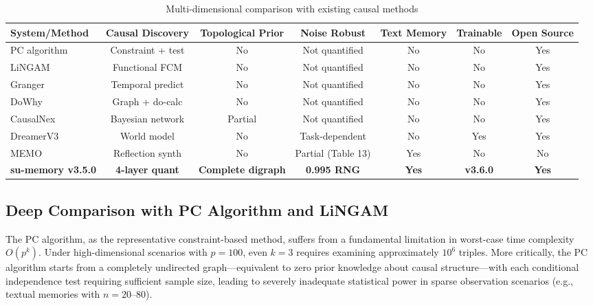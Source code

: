 \documentclass[11pt,a4paper]{article}
\begin{document}
\begin{table}[H]
\centering
\caption{Multi-dimensional comparison with existing causal methods}
\label{tab:comparison}
\small
\begin{tabular}{lcccccc}
\toprule
\textbf{System/Method} & \textbf{Causal Discovery} & \textbf{Topological Prior} & \textbf{Noise Robust} & \textbf{Text Memory} & \textbf{Trainable} & \textbf{Open Source} \\
\midrule
PC algorithm~\cite{spirtes2000}   & Constraint + test & No  & Not quantified & No  & No  & Yes \\
LiNGAM~\cite{shimizu2006}         & Functional FCM    & No  & Not quantified & No  & No  & Yes \\
Granger~\cite{granger1969}        & Temporal predict  & No  & Not quantified & No  & No  & Yes \\
DoWhy~\cite{sharma2020}           & Graph + do-calc   & No  & Not quantified & No  & No  & Yes \\
CausalNex~\cite{causalnex}        & Bayesian network  & Partial & Not quantified & No  & No  & Yes \\
DreamerV3~\cite{hafner2023}       & World model       & No  & Task-dependent & No  & Yes & Yes \\
MEMO~\cite{memo2025}              & Reflection synth  & No  & Partial (Table 13) & Yes & No  & No  \\
\midrule
\textbf{su-memory v3.5.0} & \textbf{4-layer quant} & \textbf{Complete digraph} & \textbf{0.995 RNG} & \textbf{Yes} & \textbf{v3.6.0} & \textbf{Yes} \\
\bottomrule
\end{tabular}
\end{table}

\subsection{Deep Comparison with PC Algorithm and LiNGAM}

The PC algorithm, as the representative constraint-based method, suffers from a fundamental limitation in worst-case time complexity \(O(p^k)\). Under high-dimensional scenarios with \(p = 100\), even \(k = 3\) requires examining approximately \(10^6\) triples. More critically, the PC algorithm starts from a completely undirected graph---equivalent to zero prior knowledge about causal structure---with each conditional independence test requiring sufficient sample size, leading to severely inadequate statistical power in sparse observation scenarios (e.g., textual memories with \(n = 20\)--\(80\)).
\end{document}
